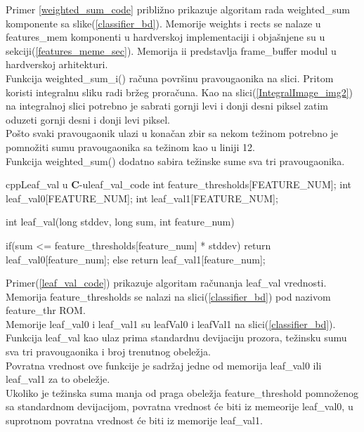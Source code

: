 Primer \ref{weighted_sum_code} približno prikazuje algoritam rada weighted\_sum
komponente sa slike(\ref{classifier_bd}).
Memorije weights i rects se nalaze u features\_mem komponenti u hardverskoj
implementaciji i objašnjene su u sekciji(\ref{features_meme_sec}).
Memorija ii predstavlja frame\_buffer modul u hardverskoj arhitekturi. \\

Funkcija weighted\_sum\_i() računa površinu pravougaonika na slici.
Pritom koristi integralnu sliku radi bržeg proračuna.
Kao na slici(\ref{IntegralImage_img2}) na integralnoj slici potrebno je sabrati
gornji levi i donji desni piksel zatim oduzeti gornji desni i donji levi
piksel.\\
Pošto svaki pravougaonik ulazi u konačan zbir sa nekom težinom potrebno je
pomnožiti sumu pravougaonika sa težinom kao u liniji 12. \\
Funkcija weighted\_sum() dodatno sabira težinske sume sva tri pravougaonika.

\newpage
\begin{code}[H]{cpp}{Leaf\_val u \textbf{C}-u}{leaf_val_code}
int feature_thresholds[FEATURE_NUM];
int leaf_val0[FEATURE_NUM];
int leaf_val1[FEATURE_NUM];

int leaf_val(long stddev,
             long sum,
             int feature_num){

  if(sum <= feature_thresholds[feature_num] * stddev)
      return leaf_val0[feature_num];
  else
      return leaf_val1[feature_num];
}
\end{code}

Primer(\ref{leaf_val_code}) prikazuje algoritam računanja leaf\_val vrednosti. \\
Memorija feature\_thresholds se nalazi na slici(\ref{classifier_bd}) pod nazivom
feature\_thr ROM. \\
Memorije leaf\_val0 i leaf\_val1 su leafVal0 i leafVal1 na
slici(\ref{classifier_bd}). \\

Funkcija leaf\_val kao ulaz prima standardnu devijaciju prozora, težinsku sumu
sva tri pravougaonika i broj trenutnog obeležja. \\
Povratna vrednost ove funkcije je sadržaj jedne od memorija leaf\_val0 ili
leaf\_val1 za to obeležje. \\

Ukoliko je težinska suma manja od praga obeležja feature\_threshold
pomnoženog sa standardnom devijacijom, povratna vrednost će biti iz memeorije
leaf\_val0, u suprotnom povratna vrednost će biti iz memorije leaf\_val1. \\

